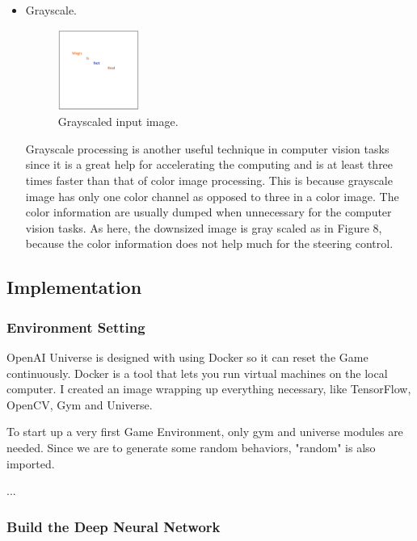 \begin{itemize}
    \item Grayscale.

	\begin{figure}[h]
	\centering
	\includegraphics[width=0.25\textwidth]{figs/magic}
	\caption{Grayscaled input image.}
	\end{figure}
    
   Grayscale processing is another useful technique in computer vision tasks since it is a great help for accelerating the computing and is at least three times faster than that of color image processing. This is because grayscale image has only one color channel as opposed to three in a color image.  The color information are usually dumped when unnecessary for the computer vision tasks. As here, the downsized image is gray scaled as in Figure 8, because the color information does not help much for the steering control. 

\end{itemize}

\subsection{Implementation}

\subsubsection{Environment Setting}

OpenAI Universe is designed with using Docker so it can reset the Game continuously. Docker is a tool that lets you run virtual machines on the local computer. I created an image wrapping up everything necessary, like TensorFlow, OpenCV, Gym and Universe.

To start up a very first Game Environment, only gym and universe modules are needed. Since we are to generate some random behaviors, "random" is also imported.

...

\subsubsection{Build the Deep Neural Network}

